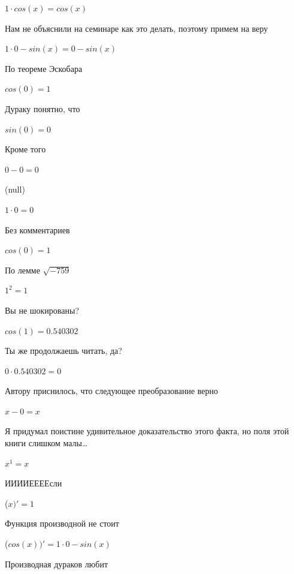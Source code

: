 \documentclass[12pt,a4paper,fleqn]{article}
\begin{document}
\begin{center}
$1 \cdot cos(x) = cos(x)$\end{center}
Нам не объяснили на семинаре как это делать, поэтому примем на веру

\begin{center}
$1 \cdot 0-sin(x) = 0-sin(x)$\end{center}
По теореме Эскобара

\begin{center}$cos(0) = 1$\end{center}
Дураку понятно, что

\begin{center}$sin(0) = 0$\end{center}
Кроме того

\begin{center}$0-0 = 0$\end{center}
(null)\cite{link4}

\begin{center}$1 \cdot 0 = 0$\end{center}
Без комментариев\cite{link4}

\begin{center}$cos(0) = 1$\end{center}
По лемме $\sqrt{-759}$
\begin{center}$1^{2} = 1$\end{center}
Вы не шокированы?\cite{link3}

\begin{center}$cos(1) = 0.540302$\end{center}
Ты же продолжаешь читать, да?

\begin{center}$0 \cdot 0.540302 = 0$\end{center}
Автору приснилось, что следующее преобразование верно

\begin{center}
$x-0 = x$\end{center}
Я придумал поистине удивительное доказательство этого факта, но поля этой книги слишком малы\ldots

\begin{center}
$x^{1} = x$\end{center}
ИИИИЕЕЕЕсли\cite{link3}

\begin{center}
 ($x)'
  = 1$\end{center}
Функция производной не стоит\cite{link2}

\begin{center}
 ($cos(x))'
  = 1 \cdot 0-sin(x)$\end{center}
Производная дураков любит\cite{link2}
\end{document}
